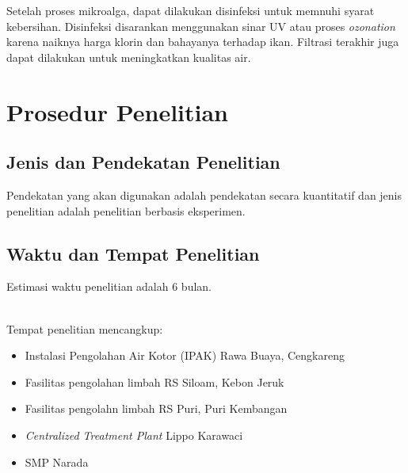 \documentclass[10pt,a4paper,hidelinks]{article}
\begin{document}
    
    Setelah proses mikroalga, dapat dilakukan disinfeksi untuk memnuhi syarat kebersihan. Disinfeksi disarankan menggunakan sinar UV atau proses \textit{ozonation} karena naiknya harga klorin dan bahayanya terhadap ikan. Filtrasi terakhir juga dapat dilakukan untuk meningkatkan kualitas air.
    \section{Prosedur Penelitian}
    \subsection{Jenis dan Pendekatan Penelitian}
    Pendekatan yang akan digunakan adalah pendekatan secara kuantitatif dan jenis penelitian adalah penelitian berbasis eksperimen.
    \subsection{Waktu dan Tempat Penelitian}
    Estimasi waktu penelitian adalah 6 bulan.\\

    \\Tempat penelitian mencangkup:
    \begin{itemize}
    \item Instalasi Pengolahan Air Kotor (IPAK) Rawa Buaya, Cengkareng
    \item Fasilitas pengolahan limbah RS Siloam, Kebon Jeruk
    \item Fasilitas pengolahn limbah RS Puri, Puri Kembangan
    \item \textit{Centralized Treatment Plant} Lippo Karawaci
 	\item SMP Narada
    \end{itemize}
    
\end{document}
